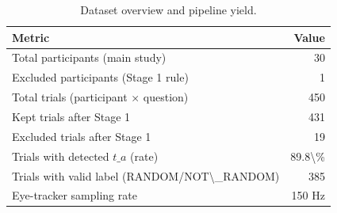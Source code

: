 \begin{table}[t]
\centering
\caption{Dataset overview and pipeline yield.}
\label{tab:dataset-overview}
\begin{tabular}{lr}
\hline
Metric & Value \\ \hline
Total participants (main study) & 30 \\ \hline
Excluded participants (Stage 1 rule) & 1 \\ \hline
Total trials (participant × question) & 450 \\ \hline
Kept trials after Stage 1 & 431 \\ \hline
Excluded trials after Stage 1 & 19 \\ \hline
Trials with detected $t\_a$ (rate) & 89.8\textbackslash{}\% \\ \hline
Trials with valid label (RANDOM/NOT\textbackslash{}\_RANDOM) & 385 \\ \hline
Eye-tracker sampling rate & 150 Hz \\ \hline
\end{tabular}
\end{table}
